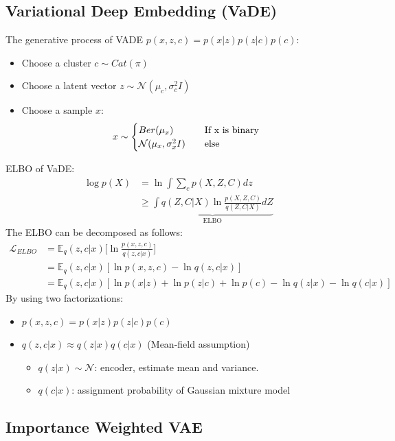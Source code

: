 \subsection{Variational Deep Embedding (VaDE)}
The generative process of VADE $p(x, z, c) = p(x|z)p(z|c)p(c)$:
\begin{itemize}
	\item Choose a cluster $c\sim Cat(\pi)$
	\item Choose a latent vector $z\sim \mathcal{N}(\mu_c, \sigma_c^2I)$
	\item Choose a sample $x$:
		\begin{align*}
			x\sim
			\begin{cases}
				Ber(\mu_x)\quad &\textrm{If }$x$ \textrm{ is binary} \\
				\mathcal{N}(\mu_x, \sigma_x^2I) \quad &\textrm{else}
			\end{cases}
		\end{align*}
\end{itemize}
ELBO of VaDE:
\begin{align}
	\log p(X) & = \ln\int \sum_c p(X,Z,C) dz \\
					 & \geq \underbrace{\int q(Z,C|X) \ln\frac{p(X, Z, C)}{q(Z,C|X)}dZ}_{\textrm{ELBO}} 
\end{align}
The ELBO can be decomposed as follows:
\begin{align*}
\mathcal{L}_{ELBO} &= \mathbb{E}_q(z,c|x)\bigg[\ln\frac{p(x,z,c)}{q(z,c|x)}\bigg]\\
				   &= \mathbb{E}_q(z,c|x)[\ln p(x,z,c) - \ln q(z,c|x)]\\
				   &= \mathbb{E}_q(z,c|x)[\ln p(x|z) + \ln p(z|c)+ \ln p(c)-\ln q(z|x)-\ln q(c|x)]
\end{align*}
By using two factorizations:
\begin{itemize}
	\item $p(x, z, c) = p(x|z)p(z|c)p(c)$
	\item $q(z,c|x) \approx q(z|x)q(c|x)$ (Mean-field assumption)
		\begin{itemize}
			\item $q(z|x)\sim \mathcal{N}$: encoder, estimate mean and variance.
			\item $q(c|x)$: assignment probability of Gaussian mixture model
		\end{itemize}
\end{itemize}

\subsection{Importance Weighted VAE}


